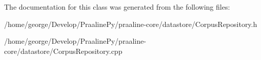 The documentation for this class was generated from the following files\+:\begin{DoxyCompactItemize}
\item 
/home/george/\+Develop/\+Praaline\+Py/praaline-\/core/datastore/Corpus\+Repository.\+h\item 
/home/george/\+Develop/\+Praaline\+Py/praaline-\/core/datastore/Corpus\+Repository.\+cpp\end{DoxyCompactItemize}

